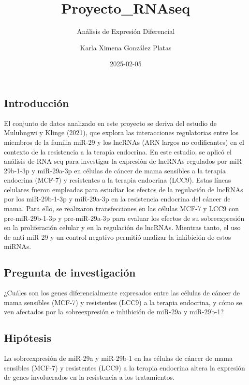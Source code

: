 \documentclass[
]{article}
\title{Proyecto\_RNAseq}
\subtitle{Análisis de Expresión Diferencial}
\author{Karla Ximena González Platas}
\date{2025-02-05}
\begin{document}
\maketitle

{
\setcounter{tocdepth}{2}
\tableofcontents
}
\subsection{Introducción}\label{introducciuxf3n}

El conjunto de datos analizado en este proyecto se deriva del estudio de
Muluhngwi y Klinge (2021), que explora las interacciones regulatorias
entre los miembros de la familia miR-29 y los lncRNAs (ARN largos no
codificantes) en el contexto de la resistencia a la terapia endocrina.
En este estudio, se aplicó el análisis de RNA-seq para investigar la
expresión de lncRNAs regulados por miR-29b-1-3p y miR-29a-3p en células
de cáncer de mama sensibles a la terapia endocrina (MCF-7) y resistentes
a la terapia endocrina (LCC9). Estas líneas celulares fueron empleadas
para estudiar los efectos de la regulación de lncRNAs por los
miR-29b-1-3p y miR-29a-3p en la resistencia endocrina del cáncer de
mama. Para ello, se realizaron transfecciones en las células MCF-7 y
LCC9 con pre-miR-29b-1-3p y pre-miR-29a-3p para evaluar los efectos de
su sobreexpresión en la proliferación celular y en la regulación de
lncRNAs. Mientras tanto, el uso de anti-miR-29 y un control negativo
permitió analizar la inhibición de estos miRNAs.

\subsection{Pregunta de
investigación}\label{pregunta-de-investigaciuxf3n}

¿Cuáles son los genes diferencialmente expresados entre las células de
cáncer de mama sensibles (MCF-7) y resistentes (LCC9) a la terapia
endocrina, y cómo se ven afectados por la sobreexpresión e inhibición de
miR-29a y miR-29b-1?

\subsection{Hipótesis}\label{hipuxf3tesis}

La sobreexpresión de miR-29a y miR-29b-1 en las células de cáncer de
mama sensibles (MCF-7) y resistentes (LCC9) a la terapia endocrina
altera la expresión de genes involucrados en la resistencia a los
tratamientos.
\end{document}

